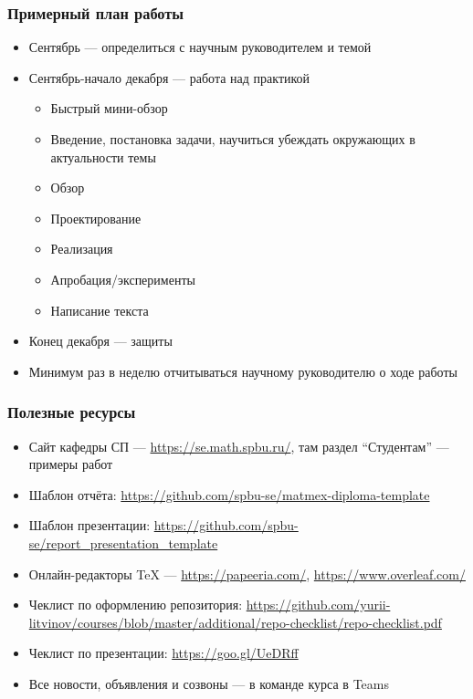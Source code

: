 \documentclass{../../slides-style}
\begin{document}
    \begin{frame}
        \frametitle{Примерный план работы}
        \begin{itemize}
            \item Сентябрь --- определиться с научным руководителем и темой
            \item Сентябрь-начало декабря --- работа над практикой
            \begin{itemize}
                \item Быстрый мини-обзор
                \item Введение, постановка задачи, научиться убеждать окружающих в актуальности темы
                \item Обзор
                \item Проектирование
                \item Реализация
                \item Апробация/эксперименты
                \item Написание текста
            \end{itemize}
            \item Конец декабря --- защиты
            \item Минимум раз в неделю отчитываться научному руководителю о ходе работы
        \end{itemize}
    \end{frame}

    \begin{frame}
        \frametitle{Полезные ресурсы}
        \begin{itemize}
            \item Сайт кафедры СП --- \url{https://se.math.spbu.ru/}, там раздел ``Студентам'' --- примеры работ
            \item Шаблон отчёта: \url{https://github.com/spbu-se/matmex-diploma-template}
            \item Шаблон презентации: \url{https://github.com/spbu-se/report_presentation_template}
            \item Онлайн-редакторы TeX --- \url{https://papeeria.com/}, \url{https://www.overleaf.com/}
            \item Чеклист по оформлению репозитория: \url{https://github.com/yurii-litvinov/courses/blob/master/additional/repo-checklist/repo-checklist.pdf}
            \item Чеклист по презентации: \url{https://goo.gl/UeDRff}
            \item Все новости, объявления и созвоны --- в команде курса в Teams
        \end{itemize}
    \end{frame}
\end{document}
